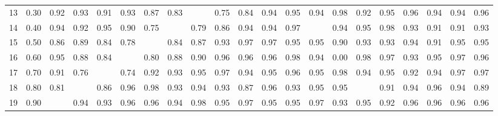 \begin{table}[ht]
\begin{tabular}{rrrrrrrrrrrrrrrrrrrrr}
  13 & 0.30 & 0.92 & 0.93 & 0.91 & 0.93 & 0.87 & 0.83 &  & 0.75 & 0.84 & 0.94 & 0.95 & 0.94 & 0.98 & 0.92 & 0.95 & 0.96 & 0.94 & 0.94 & 0.96 \\ 
  14 & 0.40 & 0.94 & 0.92 & 0.95 & 0.90 & 0.75 &  & 0.79 & 0.86 & 0.94 & 0.94 & 0.97 &  & 0.94 & 0.95 & 0.98 & 0.93 & 0.91 & 0.91 & 0.93 \\ 
  15 & 0.50 & 0.86 & 0.89 & 0.84 & 0.78 &  & 0.84 & 0.87 & 0.93 & 0.97 & 0.97 & 0.95 & 0.95 & 0.90 & 0.93 & 0.93 & 0.94 & 0.91 & 0.95 & 0.95 \\ 
  16 & 0.60 & 0.95 & 0.88 & 0.84 &  & 0.80 & 0.88 & 0.90 & 0.96 & 0.96 & 0.96 & 0.98 & 0.94 & 0.00 & 0.98 & 0.97 & 0.93 & 0.95 & 0.97 & 0.96 \\ 
  17 & 0.70 & 0.91 & 0.76 &  & 0.74 & 0.92 & 0.93 & 0.95 & 0.97 & 0.94 & 0.95 & 0.96 & 0.95 & 0.98 & 0.94 & 0.95 & 0.92 & 0.94 & 0.97 & 0.97 \\ 
  18 & 0.80 & 0.81 &  & 0.86 & 0.96 & 0.98 & 0.93 & 0.94 & 0.93 & 0.87 & 0.96 & 0.93 & 0.95 & 0.95 &  & 0.91 & 0.94 & 0.96 & 0.94 & 0.89 \\ 
  19 & 0.90 &  & 0.94 & 0.93 & 0.96 & 0.96 & 0.94 & 0.98 & 0.95 & 0.97 & 0.95 & 0.95 & 0.97 & 0.93 & 0.95 & 0.92 & 0.96 & 0.96 & 0.96 & 0.96 \\ 
   \hline
\end{tabular}
\end{table}
